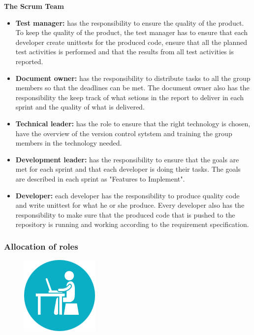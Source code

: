\noindent
{\bf The Scrum Team}
\begin{itemize}

  \item {\bf Test manager:} has the responsibility to ensure the quality of the product. To keep the quality of the product, the test manager has to ensure that each developer create unittests for the produced code, ensure that all the planned test activities is performed and that the results from all test activities is reported.

  \item {\bf Document owner:} has the responsibility to distribute tasks to all the group members so that the deadlines can be met. The document owner also has the responsibility the keep track of what setions in the report to deliver in each sprint and the quality of what is delivered.

  \item {\bf Technical leader:} has the role to ensure that the right technology is chosen, have the overview of the version control sytstem and training the group members in the technology needed.

  \item {\bf Development leader:} has the responsibility to ensure that the goals are met for each sprint and that each developer is doing their tasks. The goals are described in each sprint as "Features to Implement". 

  \item {\bf Developer:} each developer has the responsibility to produce quality code and write unittest for what he or she produce. Every developer also has the responsibility to make sure that the produced code that is pushed to the repository is running and working according to the requirement specification.
  \end{itemize} 

\subsubsection{Allocation of roles}
\begin{figure}
  \begin{center}
  \includegraphics[scale=0.7]{pictures/Work.png}
  \end{center}
\end{figure}

